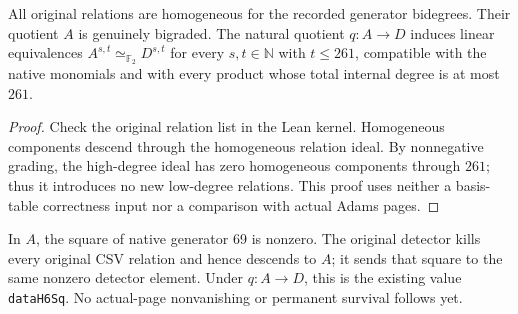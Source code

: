 \begin{theorem}
  \label{thm:lin-e2-truncation-comparison}
  \leanok
  All original relations are homogeneous for the recorded generator
  bidegrees. Their quotient $A$ is genuinely bigraded. The natural
  quotient $q:A\to D$ induces linear equivalences
  $A^{s,t}\simeq_{\mathbb F_2}D^{s,t}$ for every $s,t\in\mathbb N$
  with $t\le261$, compatible with the native monomials and with every
  product whose total internal degree is at most $261$.
\end{theorem}
\begin{proof}
  Check the original relation list in the Lean kernel. Homogeneous
  components descend through the homogeneous relation ideal. By
  nonnegative grading, the high-degree ideal has zero homogeneous
  components through $261$; thus it introduces no new low-degree
  relations. This proof uses neither a basis-table correctness input
  nor a comparison with actual Adams pages.
  \leanok
\end{proof}

\begin{lemma}
  \label{lem:lin-native-square-nonzero}
  \leanok
  In $A$, the square of native generator 69 is nonzero. The original
  detector kills every original CSV relation and hence descends to $A$;
  it sends that square to the same nonzero detector element. Under
  $q:A\to D$, this is the existing value \texttt{dataH6Sq}.
  No actual-page nonvanishing or permanent survival follows yet.
\end{lemma}

